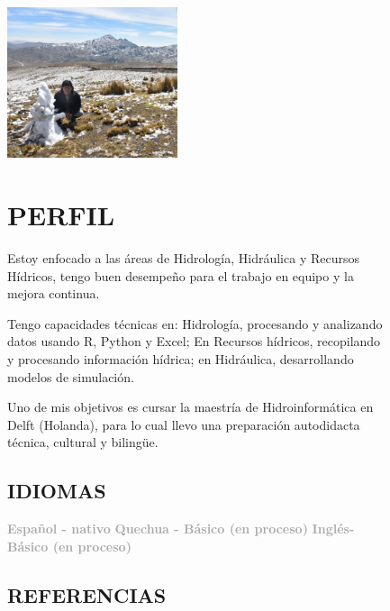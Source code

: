 \documentclass[
  10pt,
]{article}
\author{}
\date{\vspace{-2.5em}}
\begin{document}
\newcommand{\changefont}{%
    \fontsize{16}{9}\selectfont
}

\newpage

\begin{figure}[tph]
\begin{minipage}[t]{0.3\textwidth}
  \centering
  \vspace*{-6\baselineskip}
\includegraphics[width=5.0cm]{images/gperales.jpg}
  \section{PERFIL\vspace{-0.35em}}
  \justify

Estoy enfocado a las áreas de Hidrología, Hidráulica y Recursos Hídricos, tengo 
buen desempeño para el trabajo en equipo y la mejora continua.
\setlength\parskip{1em}

Tengo capacidades técnicas en: Hidrología, procesando y analizando datos usando R,
Python y Excel; En Recursos hídricos, recopilando y procesando información hídrica;
en Hidráulica, desarrollando modelos de simulación.

\setlength\parskip{1em}

Uno de mis objetivos es cursar la maestría de Hidroinformática en Delft (Holanda),
para lo cual llevo una preparación autodidacta técnica, cultural y bilingüe.

  \subsection{IDIOMAS\vspace{0em}}

\textcolor{darkgray}{\textbf{Español - nativo}\vfill\vspace{-1mm}}
\textcolor{darkgray}{\textbf{Quechua - Básico (en proceso)}\vfill\vspace{-1mm}}
\textcolor{darkgray}{\textbf{Inglés- Básico (en proceso)}\vfill\vspace{-1mm}}

  \subsection{REFERENCIAS\vspace{0em}}


\end{minipage}
\end{figure}
\end{document}
